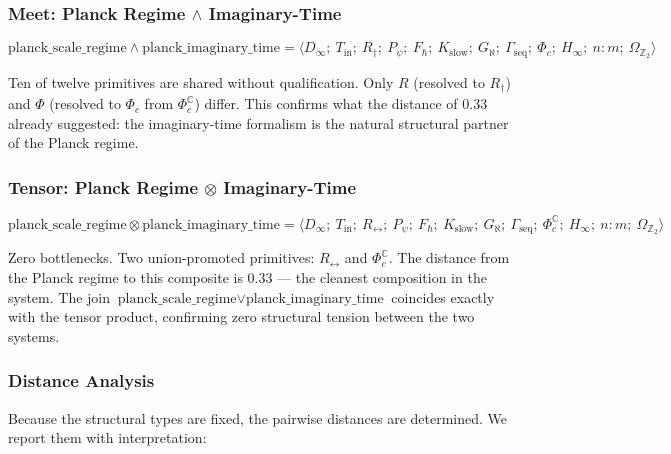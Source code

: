 \documentclass[12pt,a4paper]{article}
\begin{document}
\subsubsection{Meet: Planck Regime $\wedge$ Imaginary-Time}

\[\text{planck\_scale\_regime} \wedge \text{planck\_imaginary\_time} = \langle D_{\infty};\ T_{\text{in}};\ R_{\dagger};\ P_{\psi};\ F_{\hbar};\ K_{\text{slow}};\ G_{\aleph};\ \Gamma_{\text{seq}};\ \Phi_c;\ H_{\infty};\ n{:}m;\ \Omega_{\mathbb{Z}_2} \rangle\]

Ten of twelve primitives are shared without qualification. Only $R$ (resolved to $R_{\dagger}$) and $\Phi$ (resolved to $\Phi_c$ from $\Phi_c^\mathbb{C}$) differ. This confirms what the distance of 0.33 already suggested: the imaginary-time formalism is the natural structural partner of the Planck regime.

\subsubsection{Tensor: Planck Regime $\otimes$ Imaginary-Time}

\[\text{planck\_scale\_regime} \otimes \text{planck\_imaginary\_time} = \langle D_{\infty};\ T_{\text{in}};\ R_{\leftrightarrow};\ P_{\psi};\ F_{\hbar};\ K_{\text{slow}};\ G_{\aleph};\ \Gamma_{\text{seq}};\ \Phi_c^\mathbb{C};\ H_{\infty};\ n{:}m;\ \Omega_{\mathbb{Z}_2} \rangle\]

Zero bottlenecks. Two union-promoted primitives: $R_{\leftrightarrow}$ and $\Phi_c^\mathbb{C}$. The distance from the Planck regime to this composite is 0.33 --- the cleanest composition in the system. The join $\text{planck\_scale\_regime} \vee \text{planck\_imaginary\_time}$ coincides exactly with the tensor product, confirming zero structural tension between the two systems.

\subsubsection{Distance Analysis}

Because the structural types are fixed, the pairwise distances are determined. We report them with interpretation:
\end{document}
